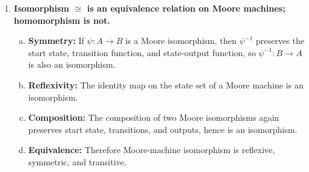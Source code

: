 \begin{enumerate}[{7.}1.]
\begin{enumerate}[(a)]
  \item \textbf{Composition:} If $\psi:A\to B$ and $\varphi:B\to C$ are
  isomorphisms, then $\varphi\circ\psi$ is bijective.  Also,
  \[
    (\varphi\circ\psi)(s_{0_A})=\varphi(s_{0_B})=s_{0_C},
  \]
  and for every state $s$ and input $\pmb{a}$,
  \[
    (\varphi\circ\psi)(\delta_A(s,\pmb{a}))
    =\varphi(\delta_B(\psi(s),\pmb{a}))
    =\delta_C((\varphi\circ\psi)(s),\pmb{a}),
  \]
  while
  \[
    \omega_A(s,\pmb{a})
    =\omega_B(\psi(s),\pmb{a})
    =\omega_C((\varphi\circ\psi)(s),\pmb{a}).
  \]
  Thus $\varphi\circ\psi$ is an isomorphism.

  \item \textbf{Equivalence:} Parts (a), (b), and (c) show that $\cong$ is
  symmetric, reflexive, and transitive.  Therefore it is an equivalence
  relation.

  \item \textbf{Homomorphism is not an equivalence relation:} Homomorphism need
  not be symmetric.  Let $A$ have two distinct states $s_0,s_1$ with the same
  transition and output behavior, and let $B$ be the one-state machine obtained
  by identifying them.  Then there is a homomorphism $A\to B$, but no inverse
  map $B\to A$ exists, so homomorphism is not symmetric.
\end{enumerate}

\item \textbf{Isomorphism $\cong$ is an equivalence relation on Moore machines; homomorphism is not.}

\begin{enumerate}[(a)]
  \item \textbf{Symmetry:} If $\psi:A\to B$ is a Moore isomorphism, then
  $\psi^{-1}$ preserves the start state, transition function, and state-output
  function, so $\psi^{-1}:B\to A$ is also an isomorphism.

  \item \textbf{Reflexivity:} The identity map on the state set of a Moore
  machine is an isomorphism.

  \item \textbf{Composition:} The composition of two Moore isomorphisms again
  preserves start state, transitions, and outputs, hence is an isomorphism.

  \item \textbf{Equivalence:} Therefore Moore-machine isomorphism is reflexive,
  symmetric, and transitive.


\end{enumerate}
\end{enumerate}
